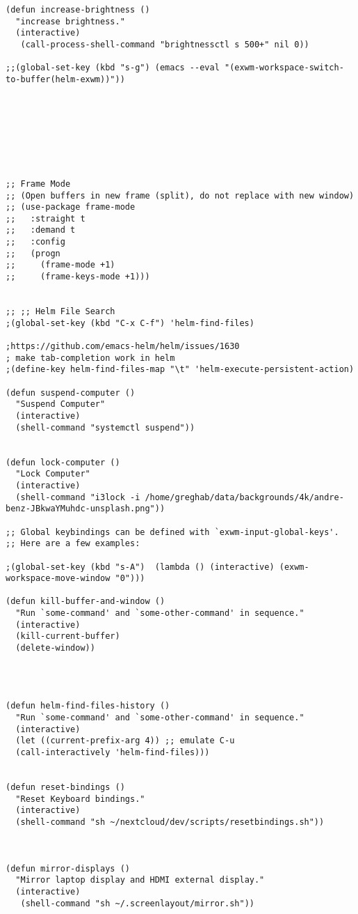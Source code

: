 \documentclass[11pt]{article}
\begin{document}
\begin{verbatim}
(defun increase-brightness ()
  "increase brightness."
  (interactive)
   (call-process-shell-command "brightnessctl s 500+" nil 0))

;;(global-set-key (kbd "s-g") (emacs --eval "(exwm-workspace-switch-to-buffer(helm-exwm))"))








;; Frame Mode 
;; (Open buffers in new frame (split), do not replace with new window)
;; (use-package frame-mode
;;   :straight t
;;   :demand t
;;   :config
;;   (progn
;;     (frame-mode +1)
;;     (frame-keys-mode +1)))


;; ;; Helm File Search
;(global-set-key (kbd "C-x C-f") 'helm-find-files)

;https://github.com/emacs-helm/helm/issues/1630
; make tab-completion work in helm
;(define-key helm-find-files-map "\t" 'helm-execute-persistent-action)

(defun suspend-computer ()
  "Suspend Computer"
  (interactive)
  (shell-command "systemctl suspend"))


(defun lock-computer ()
  "Lock Computer"
  (interactive)
  (shell-command "i3lock -i /home/greghab/data/backgrounds/4k/andre-benz-JBkwaYMuhdc-unsplash.png"))

;; Global keybindings can be defined with `exwm-input-global-keys'.
;; Here are a few examples:

;(global-set-key (kbd "s-A")  (lambda () (interactive) (exwm-workspace-move-window "0")))

(defun kill-buffer-and-window ()
  "Run `some-command' and `some-other-command' in sequence."
  (interactive)
  (kill-current-buffer)
  (delete-window))




(defun helm-find-files-history ()
  "Run `some-command' and `some-other-command' in sequence."
  (interactive)
  (let ((current-prefix-arg 4)) ;; emulate C-u
  (call-interactively 'helm-find-files)))


(defun reset-bindings ()
  "Reset Keyboard bindings."
  (interactive)
  (shell-command "sh ~/nextcloud/dev/scripts/resetbindings.sh"))



(defun mirror-displays ()
  "Mirror laptop display and HDMI external display."
  (interactive)
   (shell-command "sh ~/.screenlayout/mirror.sh"))

\end{verbatim}
\end{document}
